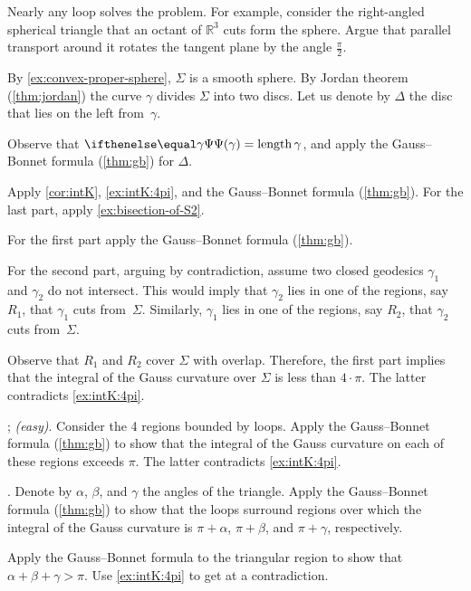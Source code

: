 \begin{multicols}{2}
Nearly any loop solves the problem.
For example, consider the right-angled spherical triangle that an octant of $\mathbb{R}^3$ cuts form the sphere.
Argue that parallel transport around it rotates the tangent plane by the angle $\tfrac\pi 2$. 

\setcounter{eqtn}{0}

By \ref{ex:convex-proper-sphere}, $\Sigma$ is a smooth sphere.
By Jordan theorem (\ref{thm:jordan}) the curve $\gamma$ divides $\Sigma$ into two discs.
Let us denote by $\Delta$ the disc that lies on the left from~$\gamma$.

Observe that $\tgc\gamma=\length\gamma$, and apply the Gauss--Bonnet formula (\ref{thm:gb}) for $\Delta$.

Apply \ref{cor:intK}, \ref{ex:intK:4pi}, and the Gauss--Bonnet formula (\ref{thm:gb}).
For the last part, apply \ref{ex:bisection-of-S2}.

 For the first part apply the Gauss--Bonnet formula (\ref{thm:gb}).

For the second part, arguing by contradiction, assume two closed geodesics $\gamma_1$ and $\gamma_2$ do not intersect. 
This would imply that $\gamma_2$ lies in one of the regions, say $R_1$, that $\gamma_1$ cuts from~$\Sigma$.
Similarly, $\gamma_1$ lies in one of the regions, say $R_2$, that $\gamma_2$ cuts from~$\Sigma$.

Observe that $R_1$ and $R_2$ cover $\Sigma$ with overlap.
Therefore, the first part implies that the integral of the Gauss curvature over $\Sigma$ is less than $4\cdot\pi$.
The latter contradicts \ref{ex:intK:4pi}.

\parbf{\ref{ex:self-intersections}}; \textit{(easy)}.
Consider the 4 regions bounded by loops.
Apply the Gauss--Bonnet formula (\ref{thm:gb}) to show that the integral of the Gauss curvature on each of these regions exceeds $\pi$.
The latter contradicts \ref{ex:intK:4pi}.

.
Denote by $\alpha$, $\beta$, and $\gamma$ the angles of the triangle.
Apply the Gauss--Bonnet formula (\ref{thm:gb}) to show that the loops surround regions over which the integral of the Gauss curvature is $\pi+\alpha$, $\pi+\beta$, and $\pi+\gamma$, respectively.

Apply the Gauss--Bonnet formula to the triangular region to show that $\alpha+\beta+\gamma>\pi$.
Use \ref{ex:intK:4pi} to get at a contradiction.



\end{multicols}
